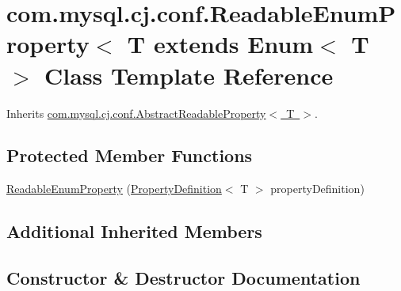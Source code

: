 \hypertarget{classcom_1_1mysql_1_1cj_1_1conf_1_1_readable_enum_property}{}\section{com.\+mysql.\+cj.\+conf.\+Readable\+Enum\+Property$<$ T extends Enum$<$ T $>$ Class Template Reference}
\label{classcom_1_1mysql_1_1cj_1_1conf_1_1_readable_enum_property}


Inherits \mbox{\hyperlink{classcom_1_1mysql_1_1cj_1_1conf_1_1_abstract_readable_property}{com.\+mysql.\+cj.\+conf.\+Abstract\+Readable\+Property$<$ T $>$}}.

\subsection*{Protected Member Functions}
\begin{DoxyCompactItemize}
\item 
\mbox{\hyperlink{classcom_1_1mysql_1_1cj_1_1conf_1_1_readable_enum_property_a9d8bf3b3415365c7d36f49ddb55040cd}{Readable\+Enum\+Property}} (\mbox{\hyperlink{interfacecom_1_1mysql_1_1cj_1_1conf_1_1_property_definition}{Property\+Definition}}$<$ T $>$ property\+Definition)
\end{DoxyCompactItemize}
\subsection*{Additional Inherited Members}


\subsection{Constructor \& Destructor Documentation}
\mbox{\label{classcom_1_1mysql_1_1cj_1_1conf_1_1_readable_enum_property_a9d8bf3b3415365c7d36f49ddb55040cd}} 
